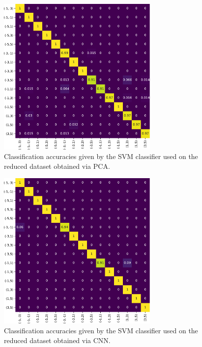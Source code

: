 \begin{figure}[tb]
  \centering
  \includegraphics[width=0.7\textwidth]{Figures/VVBs/VVBs-svcAccuracies_15classes_halftrainingdata_40dims_usedInPaper.pdf}
  \caption{
      Classification accuracies given by the SVM classifier used on the reduced dataset obtained via PCA.
    }
    \label{fig:VVBs:accuracies15classes_SVC}
\end{figure}

\begin{figure}[tb]
  \centering
  \includegraphics[width=0.7\textwidth]{Figures/VVBs/VVBs-accuracies15classes_CNN2.pdf}
  \caption{
      Classification accuracies given by the SVM classifier used on the reduced dataset obtained via CNN.
    }
    \label{fig:VVBs:accuracies15classes_CNN}
\end{figure}


